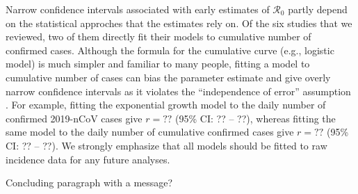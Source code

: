 \documentclass[12pt]{article}
\begin{document}
Narrow confidence intervals associated with early estimates of $\mathcal R_0$ partly depend on the statistical approches that the estimates rely on.
Of the six studies that we reviewed, two of them directly fit their models to cumulative number of confirmed cases.
Although the formula for the cumulative curve (e.g., logistic model) is much simpler and familiar to many people, 
fitting a model to cumulative number of cases can bias the parameter estimate and give overly narrow confidence intervals as it violates the ``independence of error'' assumption \citep{ma2014estimating, king2015avoidable}.
For example, fitting the exponential growth model to the daily number of confirmed 2019-nCoV cases give $r=??$ (95\% CI: ?? -- ??), whereas fitting the same model to the daily number of cumulative confirmed cases give $r=??$ (95\% CI: ?? -- ??).
We strongly emphasize that all models should be fitted to raw incidence data for any future analyses.

Concluding paragraph with a message?


\pagebreak


\end{document}
